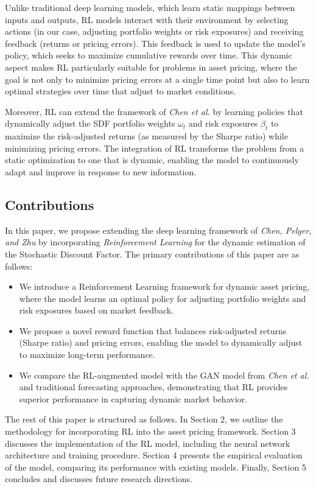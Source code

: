 Unlike traditional deep learning models, which learn static mappings between inputs and outputs, RL models interact with their environment by selecting actions (in our case, adjusting portfolio weights or risk exposures) and receiving feedback (returns or pricing errors). This feedback is used to update the model's policy, which seeks to maximize cumulative rewards over time. This dynamic aspect makes RL particularly suitable for problems in asset pricing, where the goal is not only to minimize pricing errors at a single time point but also to learn optimal strategies over time that adjust to market conditions.

Moreover, RL can extend the framework of \textit{Chen et al.} by learning policies that dynamically adjust the SDF portfolio weights \( \omega_t \) and risk exposures \( \beta_t \) to maximize the risk-adjusted returns (as measured by the Sharpe ratio) while minimizing pricing errors. The integration of RL transforms the problem from a static optimization to one that is dynamic, enabling the model to continuously adapt and improve in response to new information.

\subsection{Contributions}

In this paper, we propose extending the deep learning framework of \textit{Chen, Pelger, and Zhu} by incorporating \textit{Reinforcement Learning} for the dynamic estimation of the Stochastic Discount Factor. The primary contributions of this paper are as follows:

\begin{itemize}
    \item We introduce a Reinforcement Learning framework for dynamic asset pricing, where the model learns an optimal policy for adjusting portfolio weights and risk exposures based on market feedback.
    \item We propose a novel reward function that balances risk-adjusted returns (Sharpe ratio) and pricing errors, enabling the model to dynamically adjust to maximize long-term performance.
    \item We compare the RL-augmented model with the GAN model from \textit{Chen et al.} and traditional forecasting approaches, demonstrating that RL provides superior performance in capturing dynamic market behavior.
\end{itemize}

The rest of this paper is structured as follows. In Section 2, we outline the methodology for incorporating RL into the asset pricing framework. Section 3 discusses the implementation of the RL model, including the neural network architecture and training procedure. Section 4 presents the empirical evaluation of the model, comparing its performance with existing models. Finally, Section 5 concludes and discusses future research directions.

